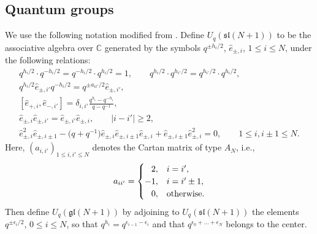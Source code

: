 \documentclass[pdftex]{sigma}
\numberwithin{equation}{section}
\begin{document}
\subsection{Quantum groups}
We use the following notation modified from \cite{Jimbo1986}.
Define $ U_q(\mathfrak{sl}(N+1)) $ to be the associative algebra over $ \mathbb{C} $ generated by the symbols $ q^{\pm h_i/2}$, $\hat{e}_{\pm, i}$, $1 \leq i\leq N$, under the following relations:
\begin{gather*}
q^{h_i/2} \cdot q^{-h_i/2}= q^{-h_i/2} \cdot q^{h_i/2}=1, \qquad q^{h_i/2} \cdot q^{h_{i'}/2}= q^{h_{i'}/2} \cdot q^{h_i/2},\nonumber\\
 q^{h_i/2} \hat{e}_{\pm, i'} q^{-h_i/2}= q^{\pm a_{ii'}/2} \hat{e}_{\pm, i'},\nonumber\\
[\hat{e}_{+,i}, \hat{e}_{-,i'}] =\delta_{i,i'} \frac{q^{h_i}-q^{-h_i}}{q-q^{-1}}, \nonumber\\
 \hat{e}_{\pm, i}\hat{e}_{\pm, i'} = \hat{e}_{\pm ,i'}\hat{e}_{\pm ,i}, \qquad |i-i'|\geq 2, \nonumber\\
 \hat{e}_{\pm, i}^2 \hat{e}_{\pm, i\pm 1} -\big(q+q^{-1}\big) \hat{e}_{\pm, i} \hat{e}_{\pm ,i\pm 1} \hat{e}_{\pm ,i} + \hat{e}_{\pm, i\pm 1} \hat{e}_{\pm, i}^2=0,\qquad 1\leq i, i\pm 1 \leq N. %
\end{gather*}
Here, $ (a_{i,i'})_{1\leq i,i' \leq N} $ denotes the Cartan matrix of type $ A_N $, i.e.,
\begin{equation*}
a_{ii'}=
\begin{cases}
\hphantom{-}2,& i = i',\\ -1, & i=i' \pm 1,\\ \hphantom{-}0,& \text{otherwise}.
\end{cases}
\end{equation*}
Then define $ U_q(\mathfrak{gl}(N+1)) $ by adjoining to $ U_q(\mathfrak{sl}(N+1)) $ the elements $ q^{\pm \epsilon_i/2}$, $0 \leq i \leq N $, so that $ q^{h_i}= q^{\epsilon_{i-1}-\epsilon_i} $ and that $ q^{\epsilon_0+\dots +\epsilon_N} $ belongs to the center.
\end{document}
